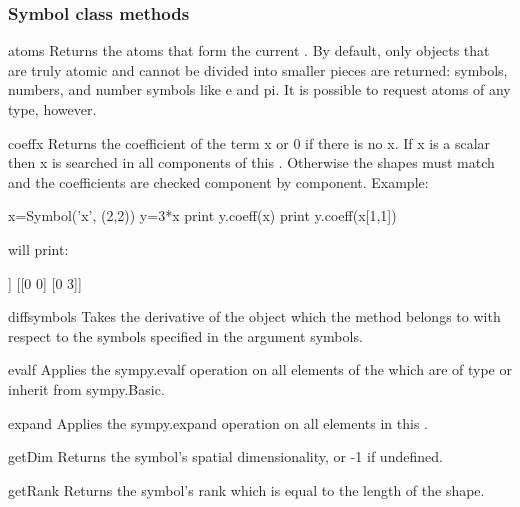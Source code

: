 \subsubsection{Symbol class methods}
\begin{methoddesc}[Symbol]{atoms}{}
Returns the atoms that form the current \SYMBOL.
By default, only objects that are truly atomic and cannot be divided
into smaller pieces are returned: symbols, numbers, and number
symbols like e and pi. It is possible to request atoms of any type,
however.
\end{methoddesc}

\begin{methoddesc}[Symbol]{coeff}{x }
Returns the coefficient of the term x or 0 if there is no x.
If x is a scalar \SYMBOL then x is searched in all components of
this \SYMBOL. Otherwise the shapes must match and the coefficients are
checked component by component.
Example:
\begin{python}
     x=Symbol('x', (2,2))
     y=3*x
     print y.coeff(x)
     print y.coeff(x[1,1])
\end{python}
will print:
\begin{python}
     [[3 3]
      [3 3]]
     [[0 0]
      [0 3]]
\end{python} 
\end{methoddesc}
\begin{methoddesc}[Symbol]{diff}{symbols}
Takes the derivative of the \SYMBOL object which the method belongs to with respect to the symbols specified in the argument symbols.
\end{methoddesc}
\begin{methoddesc}[Symbol]{evalf}{}
Applies the sympy.evalf operation on all elements of the \SYMBOL which are of type or inherit from sympy.Basic.
\end{methoddesc}
\begin{methoddesc}[Symbol]{expand}{}
Applies the sympy.expand operation on all elements in this \SYMBOL.
\end{methoddesc}
\begin{methoddesc}[Symbol]{getDim}{}
Returns the symbol's spatial dimensionality, or -1 if undefined.
\end{methoddesc}
\begin{methoddesc}[Symbol]{getRank}{}
Returns the symbol's rank which is equal to the length of the shape.
\end{methoddesc}
